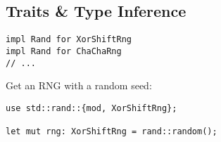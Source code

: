 \documentclass[14pt]{beamer}
\begin{document}
\subsection{Traits \& Type Inference}
\begin{frame}[fragile]
  \begin{verbatim}
impl Rand for XorShiftRng
impl Rand for ChaChaRng
// ...
  \end{verbatim}

\pause
Get an RNG with a random seed:

  \begin{verbatim}
use std::rand::{mod, XorShiftRng};

let mut rng: XorShiftRng = rand::random();
  \end{verbatim}
\end{frame}
\end{document}
